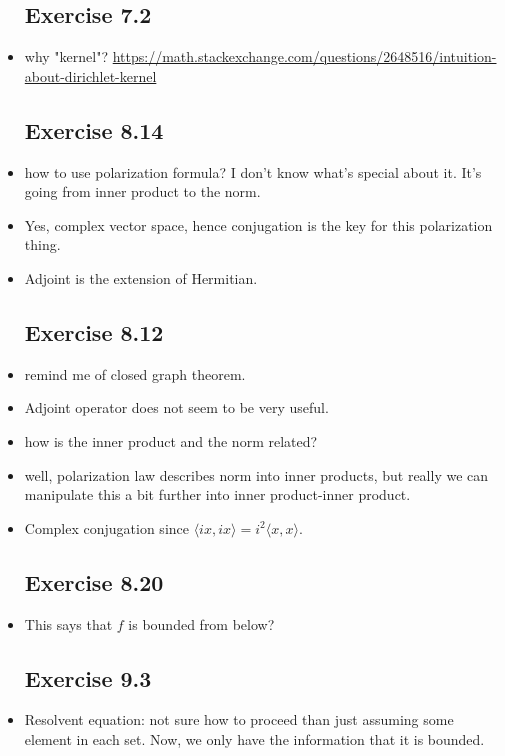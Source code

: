 \documentclass{article}
\theoremstyle{remark}
\begin{document}
\begin{itemize}
\subsection*{Exercise 7.2}
\item why "kernel"? \url{https://math.stackexchange.com/questions/2648516/intuition-about-dirichlet-kernel}






\subsection*{Exercise 8.14}
\item how to use polarization formula? I don't know what's special about it. It's going from inner product to the norm. 
\item Yes, complex vector space, hence conjugation is the key for this polarization thing.
\item Adjoint is the extension of Hermitian.











\subsection*{Exercise 8.12}
\item remind me of closed graph theorem.
\item Adjoint operator does not seem to be very useful.
\item how is the inner product and the norm related?
\item well, polarization law describes norm into inner products, but really we can manipulate this a bit further into inner product-inner product. 
\item Complex conjugation since $\langle ix,ix\rangle=i^2\langle x,x\rangle$.

\subsection*{Exercise 8.20}
\item This says that $f$ is bounded from below?



\subsection*{Exercise 9.3}
\item Resolvent equation: not sure how to proceed than just assuming some element in each set. Now, we only have the information that it is bounded.


\end{itemize}
\end{document}
